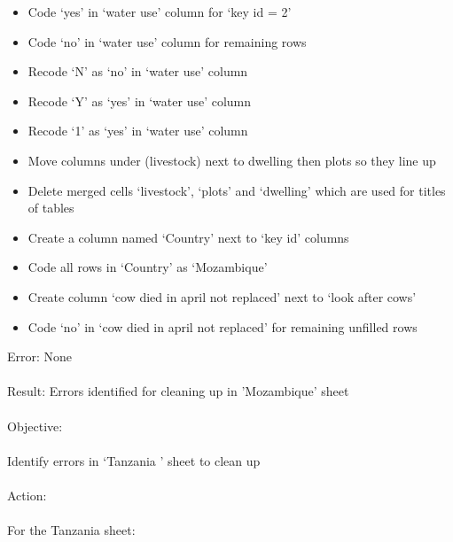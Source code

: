 \documentclass{article}
\begin{document}
\begin{itemize}
\item Code ‘yes’ in ‘water use’ column for ‘key id = 2’
\item Code ‘no’ in ‘water use’ column for remaining rows
\item Recode ‘N’ as ‘no’ in ‘water use’ column
\item Recode ‘Y’ as ‘yes’ in ‘water use’ column
\item Recode ‘1’ as ‘yes’ in ‘water use’ column
\item Move columns under (livestock) next to dwelling then plots so they line up
\item Delete merged cells ‘livestock’, ‘plots’ and ‘dwelling’ which are used for titles of tables
\item Create a column named ‘Country’ next to ‘key id’ columns
\item Code all rows in ‘Country’ as ‘Mozambique’
\item Create column ‘cow died in april not replaced’ next to ‘look after cows’
\item Code ‘no’ in ‘cow died in april not replaced’ for remaining unfilled rows
\end{itemize}
Error: None\\\\
Result: Errors identified for cleaning up in 'Mozambique' sheet \\
\\
Objective: \\\\
Identify errors in ‘Tanzania ’ sheet to clean up\\
\\
Action:\\\\
For the Tanzania sheet:
\end{document}
